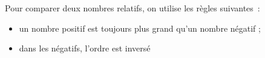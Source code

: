 Pour comparer deux nombres relatifs, on utilise les règles
suivantes~:
\begin{itemize}
    \item un nombre positif est toujours plus grand qu'un nombre négatif ;
    \item dans les négatifs, l'ordre est inversé
\end{itemize}